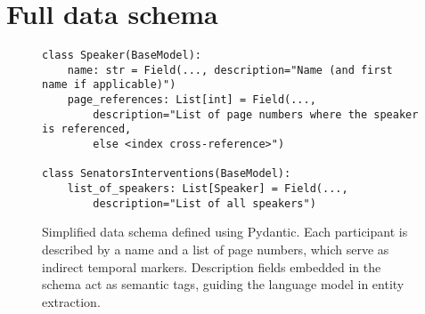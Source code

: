 \section{Full data schema}
\label{appdx:schema}
\begin{figure}[H]
\small
\begin{verbatim}
class Speaker(BaseModel):
    name: str = Field(..., description="Name (and first name if applicable)")
    page_references: List[int] = Field(..., 
        description="List of page numbers where the speaker is referenced, 
        else <index cross-reference>")

class SenatorsInterventions(BaseModel):
    list_of_speakers: List[Speaker] = Field(..., 
        description="List of all speakers")
\end{verbatim}
\caption{Simplified data schema defined using Pydantic. Each participant is described by a name and a list of page numbers, which serve as indirect temporal markers. Description fields embedded in the schema act as semantic tags, guiding the language model in entity extraction.}
\label{fig:pydantic_schema}
\end{figure}
